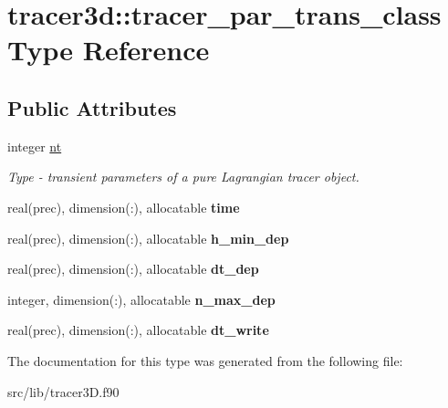\hypertarget{structtracer3d_1_1tracer__par__trans__class}{}\section{tracer3d\+:\+:tracer\+\_\+par\+\_\+trans\+\_\+class Type Reference}
\label{structtracer3d_1_1tracer__par__trans__class}
\subsection*{Public Attributes}
\begin{DoxyCompactItemize}
\item 
\mbox{\label{structtracer3d_1_1tracer__par__trans__class_acd1f347b090a9d50fb5c248bfd5382e4}} 
integer \mbox{\hyperlink{structtracer3d_1_1tracer__par__trans__class_acd1f347b090a9d50fb5c248bfd5382e4}{nt}}
\begin{DoxyCompactList}\small\item\em Type -\/ transient parameters of a pure Lagrangian tracer object. \end{DoxyCompactList}\item 
\mbox{\label{structtracer3d_1_1tracer__par__trans__class_acf9adabf777d904bd8b763cfeb8a4e94}} 
real(prec), dimension(\+:), allocatable {\bfseries time}
\item 
\mbox{\label{structtracer3d_1_1tracer__par__trans__class_a62efb8dbf563d10983dfdf951d2628dc}} 
real(prec), dimension(\+:), allocatable {\bfseries h\+\_\+min\+\_\+dep}
\item 
\mbox{\label{structtracer3d_1_1tracer__par__trans__class_a076f420209f6c2ff1aa118c93c7d1506}} 
real(prec), dimension(\+:), allocatable {\bfseries dt\+\_\+dep}
\item 
\mbox{\label{structtracer3d_1_1tracer__par__trans__class_ac5403415223ceab61201747c6d141f51}} 
integer, dimension(\+:), allocatable {\bfseries n\+\_\+max\+\_\+dep}
\item 
\mbox{\label{structtracer3d_1_1tracer__par__trans__class_abd94365b132aef667b12859310a6fb3c}} 
real(prec), dimension(\+:), allocatable {\bfseries dt\+\_\+write}
\end{DoxyCompactItemize}


The documentation for this type was generated from the following file\+:\begin{DoxyCompactItemize}
\item 
src/lib/tracer3\+D.\+f90\end{DoxyCompactItemize}
